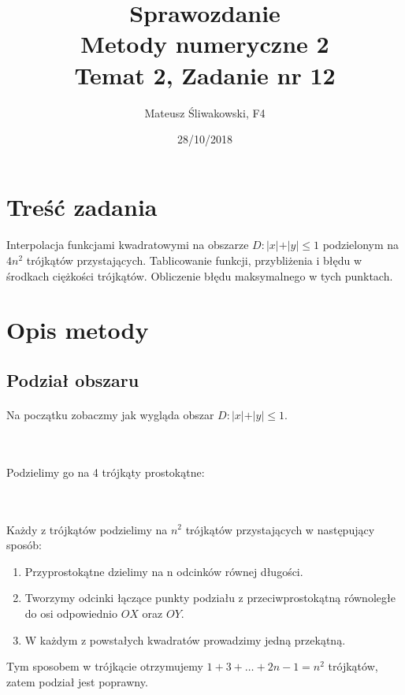 \documentclass{article}
\title{Sprawozdanie \\Metody numeryczne 2 \\\textbf{Temat 2, Zadanie nr 12}}
\date{28/10/2018}
\author{Mateusz Śliwakowski, F4}
\begin{document}
  \maketitle
	  \newpage

\section{Treść zadania}
\paragraph{}
Interpolacja funkcjami kwadratowymi na obszarze $D: \vert x \vert + \vert y \vert \leq 1$ podzielonym na $4n^2$ trójkątów przystających. Tablicowanie funkcji, przybliżenia i błędu w środkach ciężkości trójkątów. Obliczenie błędu maksymalnego w tych punktach.
\section{Opis metody}
\subsection{Podział obszaru}
\paragraph{}
Na początku zobaczmy jak wygląda obszar $D: \vert x \vert + \vert y \vert \leq 1$.\\\\
\\
Podzielimy go na 4 trójkąty prostokątne:\\\\
\\
Każdy z trójkątów podzielimy na $n^2$ trójkątów przystających w następujący sposób:
\begin{enumerate}
\item Przyprostokątne dzielimy na n odcinków równej długości.
\item Tworzymy odcinki łączące punkty podziału z przeciwprostokątną równoległe do osi odpowiednio $OX$ oraz $OY$.
\item W każdym z powstałych kwadratów prowadzimy jedną przekątną.
\end{enumerate}
Tym sposobem w trójkącie otrzymujemy $1 + 3 + \dots + 2n-1 = n^2$ trójkątów, zatem podział jest poprawny.
\end{document}
